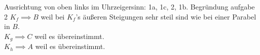\documentclass{report}
\begin{document}




Ausrichtung von oben links im Uhrzeigersinn: 1a, 1c, 2, 1b.
Begründung aufgabe 2
$K_f\implies B$ weil bei $K_f$'s äußeren Steigungen sehr steil sind wie bei
einer Parabel in $B$.\\
$K_g\implies C$ weil es übereinstimmt.\\
$K_h\implies A$ weil es übereinstimmt.\\

\end{document}
